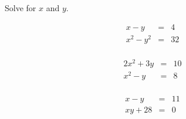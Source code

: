 \documentclass[12pt,letterpaper]{orulawork}
\newif\ifanswerkey
\newcommand{\answer}[1]{%
	\ifanswerkey%
	{\\\color{red}[Ans: #1]}%
	\fi%
}
\begin{document}
\begin{question}
	Solve for $x$ and $y$.
	\begin{exercises}
		\item%
		\begin{eqnarray*}
			x-y & = & 4 \\
			x^2-y^2 & = & 32 \\
		\end{eqnarray*} \answer{$(6,2)$}
		\item%
		\begin{eqnarray*}
			2x^2+3y & = & 10 \\
			x^2-y & = & 8 \\
		\end{eqnarray*} \answer{$(2.61,-1.20)$ and $(-2.61,-1.20)$}
		\item%
		\begin{eqnarray*}
			x-y & = & 11 \\
			xy+28 & = & 0 \\
		\end{eqnarray*} \answer{$(4,-7)$ and $(7,-4)$}
	\end{exercises}
\end{question}

\end{document}
